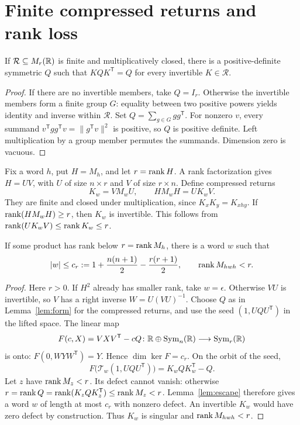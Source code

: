 \section{Finite compressed returns and rank loss}
\begin{lemma}\label{lem:form}
If \(\mathcal R\subseteq M_r(\mathbb R)\) is finite and multiplicatively closed, there is a positive-definite symmetric \(Q\) such that \(KQK^{\mathsf T}=Q\) for every invertible \(K\in\mathcal R\).
\end{lemma}
\begin{proof}
If there are no invertible members, take \(Q=I_r\). Otherwise the invertible members form a finite group \(G\): equality between two positive powers yields identity and inverse within \(\mathcal R\). Set \(Q=\sum_{g\in G}gg^{\mathsf T}\). For nonzero \(v\), every summand \(v^{\mathsf T}gg^{\mathsf T}v=\|g^{\mathsf T}v\|^2\) is positive, so \(Q\) is positive definite. Left multiplication by a group member permutes the summands. Dimension zero is vacuous.
\end{proof}

Fix a word \(h\), put \(H=M_h\), and let \(r=\operatorname{rank} H\). A rank factorization gives \(H=UV\), with \(U\) of size \(n\times r\) and \(V\) of size \(r\times n\). Define compressed returns
\[
 K_w=VM_wU,\qquad HM_wH=UK_wV.
\]
They are finite and closed under multiplication, since \(K_xK_y=K_{xhy}\).
If \(\operatorname{rank}(HM_wH)\geq r\), then \(K_w\) is invertible. This follows from \(\operatorname{rank}(UK_wV)\leq\operatorname{rank} K_w\leq r\).

\begin{lemma}\label{lem:drop}
If some product has rank below \(r=\operatorname{rank} M_h\), there is a word \(w\) such that
\[
 |w|\leq c_r:=1+\frac{n(n+1)}2-\frac{r(r+1)}2,
 \qquad \operatorname{rank} M_{hwh}<r.
\]
\end{lemma}
\begin{proof}
Here \(r>0\). If \(H^2\) already has smaller rank, take \(w=\epsilon\). Otherwise \(VU\) is invertible, so \(V\) has a right inverse \(W=U(VU)^{-1}\). Choose \(Q\) as in Lemma~\ref{lem:form} for the compressed returns, and use the seed \((1,UQU^{\mathsf T})\) in the lifted space. The linear map
\[
 F(c,X)=VXV^{\mathsf T}-cQ\colon
 \mathbb R\oplus\operatorname{Sym}_n(\mathbb R)\longrightarrow\operatorname{Sym}_r(\mathbb R)
\]
is onto: \(F(0,WYW^{\mathsf T})=Y\). Hence \(\dim\ker F=c_r\). On the orbit of the seed,
\[
 F\bigl(\mathcal T_w(1,UQU^{\mathsf T})\bigr)=K_wQK_w^{\mathsf T}-Q.
\]
Let \(z\) have \(\operatorname{rank} M_z<r\). Its defect cannot vanish: otherwise
\(r=\operatorname{rank} Q=\operatorname{rank}(K_zQK_z^{\mathsf T})\leq\operatorname{rank} M_z<r\).
Lemma~\ref{lem:escape} therefore gives a word \(w\) of length at most \(c_r\) with nonzero defect. An invertible \(K_w\) would have zero defect by construction. Thus \(K_w\) is singular and \(\operatorname{rank} M_{hwh}<r\).
\end{proof}

